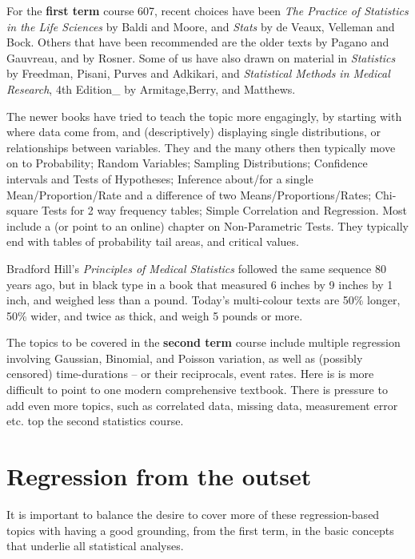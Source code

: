 \documentclass[]{book}
\begin{document}
For the \textbf{first term} course 607, recent choices have been \emph{The Practice of Statistics in the Life Sciences} by Baldi and Moore, and \emph{Stats} by de Veaux, Velleman and Bock. Others that have been recommended are the older texts by Pagano and Gauvreau, and by Rosner. Some of us have also drawn on material in \emph{Statistics} by Freedman, Pisani, Purves and Adkikari, and
\emph{Statistical Methods in Medical Research}, 4th Edition\_ by
Armitage,Berry, and Matthews.

The newer books have tried to teach the topic more engagingly, by starting with where data come from, and (descriptively) displaying single distributions, or relationships between variables. They and the many others then typically move on to Probability; Random Variables; Sampling Distributions; Confidence intervals and Tests of Hypotheses; Inference about/for a single Mean/Proportion/Rate and a difference of two Means/Proportions/Rates; Chi-square Tests for 2 way frequency tables; Simple Correlation and Regression. Most include a (or point to an online) chapter on Non-Parametric Tests. They typically end with tables of probability tail areas, and critical values.

Bradford Hill's \emph{Principles of Medical Statistics} followed the same sequence 80 years ago, but in black type in a book that measured 6 inches by 9 inches by 1 inch, and weighed less than a pound. Today's multi-colour texts are 50\% longer, 50\% wider, and twice as thick, and weigh 5 pounds or more.

The topics to be covered in the \textbf{second term} course include multiple regression involving
Gaussian, Binomial, and Poisson variation, as well
as (possibly censored) time-durations -- or their reciprocals, event rates. Here is is more difficult to point to one modern comprehensive textbook.
There is pressure to add even more topics, such as correlated data, missing data, measurement error etc. top the second statistics course.

\hypertarget{regression-from-the-outset}{%
\section{Regression from the outset}\label{regression-from-the-outset}}

It is important to balance the desire to cover more of these regression-based topics with having a good grounding, from the first term, in the basic concepts that underlie all statistical analyses.
\end{document}
